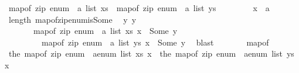 \begin{isabellebody}
\ {\isachardoublequoteopen}map{\isacharunderscore}{\kern0pt}of\ {\isacharparenleft}{\kern0pt}zip\ {\isacharparenleft}{\kern0pt}enum\ {\isacharcolon}{\kern0pt}{\isacharcolon}{\kern0pt}\ {\isacharprime}{\kern0pt}a\ list{\isacharparenright}{\kern0pt}\ xs{\isacharparenright}{\kern0pt}\ {\isacharequal}{\kern0pt}\ map{\isacharunderscore}{\kern0pt}of\ {\isacharparenleft}{\kern0pt}zip\ {\isacharparenleft}{\kern0pt}enum\ {\isacharcolon}{\kern0pt}{\isacharcolon}{\kern0pt}\ {\isacharprime}{\kern0pt}a\ list{\isacharparenright}{\kern0pt}\ ys{\isacharparenright}{\kern0pt}{\isachardoublequoteclose}\isanewline
\ \ \isamarkupfalse%
\isanewline
\ \ \ \ \isamarkupfalse%
\ x\ {\isacharcolon}{\kern0pt}{\isacharcolon}{\kern0pt}\ {\isacharprime}{\kern0pt}a\isanewline
\ \ \ \ \isamarkupfalse%
\ length\ map{\isacharunderscore}{\kern0pt}of{\isacharunderscore}{\kern0pt}zip{\isacharunderscore}{\kern0pt}enum{\isacharunderscore}{\kern0pt}is{\isacharunderscore}{\kern0pt}Some\ \isamarkupfalse%
\ y{}\ y{}\isanewline
\ \ \ \ \ \ \ {\isachardoublequoteopen}map{\isacharunderscore}{\kern0pt}of\ {\isacharparenleft}{\kern0pt}zip\ {\isacharparenleft}{\kern0pt}enum\ {\isacharcolon}{\kern0pt}{\isacharcolon}{\kern0pt}\ {\isacharprime}{\kern0pt}a\ list{\isacharparenright}{\kern0pt}\ xs{\isacharparenright}{\kern0pt}\ x\ {\isacharequal}{\kern0pt}\ Some\ y{}{\isachardoublequoteclose}\isanewline
\ \ \ \ \ \ \ \ \ {\isachardoublequoteopen}map{\isacharunderscore}{\kern0pt}of\ {\isacharparenleft}{\kern0pt}zip\ {\isacharparenleft}{\kern0pt}enum\ {\isacharcolon}{\kern0pt}{\isacharcolon}{\kern0pt}\ {\isacharprime}{\kern0pt}a\ list{\isacharparenright}{\kern0pt}\ ys{\isacharparenright}{\kern0pt}\ x\ {\isacharequal}{\kern0pt}\ Some\ y{}{\isachardoublequoteclose}\ \isamarkupfalse%
\ blast\isanewline
\ \ \ \ \isamarkupfalse%
\ \isamarkupfalse%
\ map{\isacharunderscore}{\kern0pt}of\isanewline
\ \ \ \ \ \ \isamarkupfalse%
\ {\isachardoublequoteopen}the\ {\isacharparenleft}{\kern0pt}map{\isacharunderscore}{\kern0pt}of\ {\isacharparenleft}{\kern0pt}zip\ {\isacharparenleft}{\kern0pt}enum\ {\isacharcolon}{\kern0pt}{\isacharcolon}{\kern0pt}\ {\isacharprime}{\kern0pt}a{\isacharcolon}{\kern0pt}{\isacharcolon}{\kern0pt}enum\ list{\isacharparenright}{\kern0pt}\ xs{\isacharparenright}{\kern0pt}\ x{\isacharparenright}{\kern0pt}\ {\isacharequal}{\kern0pt}\ the\ {\isacharparenleft}{\kern0pt}map{\isacharunderscore}{\kern0pt}of\ {\isacharparenleft}{\kern0pt}zip\ {\isacharparenleft}{\kern0pt}enum\ {\isacharcolon}{\kern0pt}{\isacharcolon}{\kern0pt}\ {\isacharprime}{\kern0pt}a{\isacharcolon}{\kern0pt}{\isacharcolon}{\kern0pt}enum\ list{\isacharparenright}{\kern0pt}\ ys{\isacharparenright}{\kern0pt}\ x{\isacharparenright}{\kern0pt}{\isachardoublequoteclose}\isanewline

\end{isabellebody}
